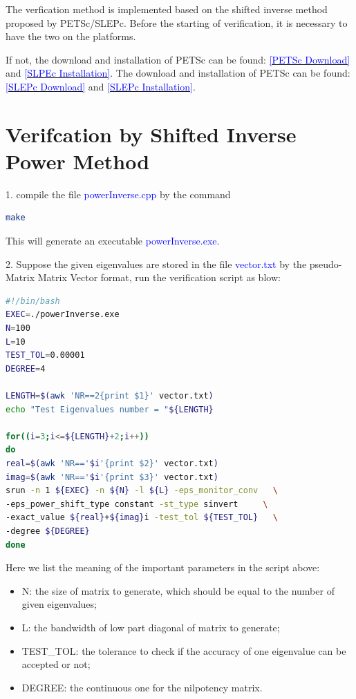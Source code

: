 \documentclass[a4paper, 10 pt]{report}
\begin{document}
	The verfication method is implemented based on the shifted inverse method proposed by PETSc/SLEPc. Before the starting of verification, it is necessary to have the two on the platforms.
	
	If not, the download and installation of PETSc can be found: \href{https://www.mcs.anl.gov/petsc/download/index.html}{\textcolor{blue}{[PETSc Download]}} and \href{https://www.mcs.anl.gov/petsc/documentation/installation.html}{\textcolor{blue}{[SLPEc Installation]}}. The download and installation of PETSc can be found: \href{http://slepc.upv.es/download/}{\textcolor{blue}{[SLEPc Download]}} and \href{http://slepc.upv.es/documentation/instal.htm}{\textcolor{blue}{[SLEPc Installation]}}.
	
	\section{Verifcation by Shifted Inverse Power Method}
	
	1. compile the file \textcolor{blue}{powerInverse.cpp} by the command
	
	\begin{lstlisting}[language=bash,frame=single]
   make
	\end{lstlisting}
	
	This will generate an executable  \textcolor{blue}{powerInverse.exe}.
	
	2. Suppose the given eigenvalues are stored in the file \textcolor{blue}{vector.txt} by the pseudo-Matrix Matrix Vector format, run the verification script as blow:
		\begin{lstlisting}[language=bash,frame=single]
#!/bin/bash
EXEC=./powerInverse.exe
N=100
L=10
TEST_TOL=0.00001
DEGREE=4

LENGTH=$(awk 'NR==2{print $1}' vector.txt)
echo "Test Eigenvalues number = "${LENGTH}

for((i=3;i<=${LENGTH}+2;i++))
do
real=$(awk 'NR=='$i'{print $2}' vector.txt)
imag=$(awk 'NR=='$i'{print $3}' vector.txt)
srun -n 1 ${EXEC} -n ${N} -l ${L} -eps_monitor_conv   \
-eps_power_shift_type constant -st_type sinvert     \
-exact_value ${real}+${imag}i -test_tol ${TEST_TOL}   \
-degree ${DEGREE}
done

   \end{lstlisting}

	Here we list the meaning of the important parameters in the script above:
	
	\begin{itemize}
		\item N: the size of matrix to generate, which should be equal to the number of given eigenvalues;
		\item L: the bandwidth of low part diagonal of matrix to generate;
		\item TEST\_TOL: the tolerance to check if the accuracy of one eigenvalue can be accepted or not;
		\item DEGREE: the continuous one for the nilpotency matrix.
	\end{itemize}
\end{document}
